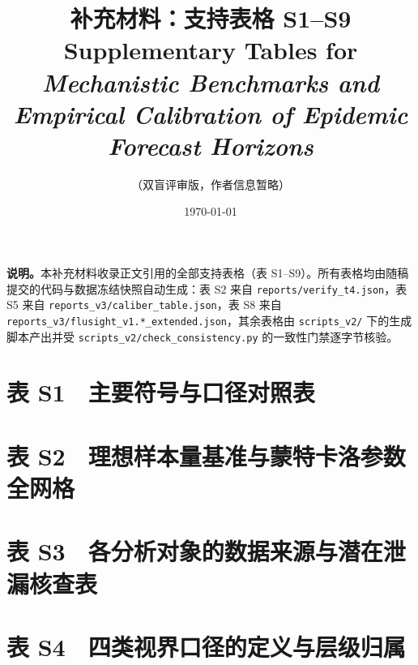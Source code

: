 \documentclass[11pt,a4paper]{article}
\title{\textbf{补充材料：支持表格 S1--S9}\\[0.4em]
\large Supplementary Tables for\\
\emph{Mechanistic Benchmarks and Empirical Calibration of Epidemic Forecast Horizons}}
\author{（双盲评审版，作者信息暂略）}
\date{\today}
\newcommand{\suppdir}{../tables_v3}
\begin{document}
\maketitle

\noindent\textbf{说明。}本补充材料收录正文引用的全部支持表格（表 S1--S9）。所有表格均由随稿提交的代码与数据冻结快照自动生成：表 S2 来自 \texttt{reports/verify\_t4.json}，表 S5 来自 \texttt{reports\_v3/caliber\_table.json}，表 S8 来自 \texttt{reports\_v3/flusight\_v1.*\_extended.json}，其余表格由 \texttt{scripts\_v2/} 下的生成脚本产出并受 \texttt{scripts\_v2/check\_consistency.py} 的一致性门禁逐字节核验。

\section*{表 S1　主要符号与口径对照表}
\begin{table}[htbp]\centering\footnotesize
\caption{全文主要符号、名称与定义口径}

\end{table}

\clearpage
\section*{表 S2　理想样本量基准与蒙特卡洛参数全网格}
\begin{table}[htbp]\centering\footnotesize
\caption{定理 4（Fisher 信息与 Cramér--Rao 界）验证的完整参数网格。$C$ 为单代完全观测的样本量基准（单位信噪比 $C=861$、80\% 功效工作点 $C=1{,}300$，以及本文实测 $k$ 对应的 $C=2{,}162$ 与 $C=6{,}593$）；经验方差为 50{,}000 次蒙特卡洛数值极大似然的方差}

\end{table}

\section*{表 S3　各分析对象的数据来源与潜在泄漏核查表}
\begin{table}[htbp]\centering\footnotesize
\caption{各分析对象的参数来源、真值口径与未来信息依赖}

\end{table}

\section*{表 S4　四类视界口径的定义与层级归属}
\begin{table}[htbp]\centering\footnotesize
\caption{四类视界的生成模型、层级归属与适用数据}

\end{table}
\end{document}
